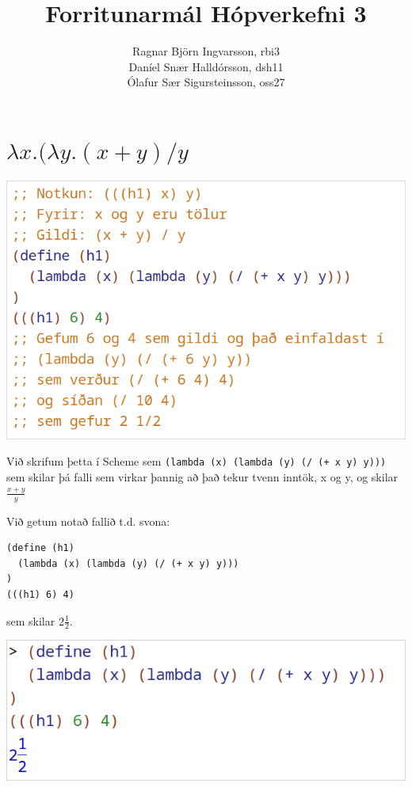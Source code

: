 \documentclass{article}
\title{Forritunarmál Hópverkefni 3}
\author{Ragnar Björn Ingvarsson, rbi3 \\
Daníel Snær Halldórsson, dsh11 \\
Ólafur Sær Sigursteinsson, oss27}
\begin{document}
\renewcommand\thepage{}
	
	\maketitle

	\newpage
	\setcounter{page}{1}
	\renewcommand\thepage{\arabic{page}}

	\section{$\lambda x.(\lambda y.(x + y)/y$}
	\includegraphics[scale=0.3]{h1.png}

	Við skrifum þetta í Scheme sem \texttt{(lambda (x) (lambda (y) 
	(/ (+ x y) y)))} sem skilar þá falli sem virkar þannig
	að það tekur tvenn inntök, 
	x og y, og skilar $\frac{x + y}{y}$  

	Við getum notað fallið t.d. svona: 
	\begin{verbatim}
(define (h1)
  (lambda (x) (lambda (y) (/ (+ x y) y)))
)
(((h1) 6) 4)
	\end{verbatim}
	sem skilar 
	$2\frac{1}{2}$. 

	\begin{center}
	\includegraphics[scale=0.375]{64.png}
	\end{center}
\end{document}
